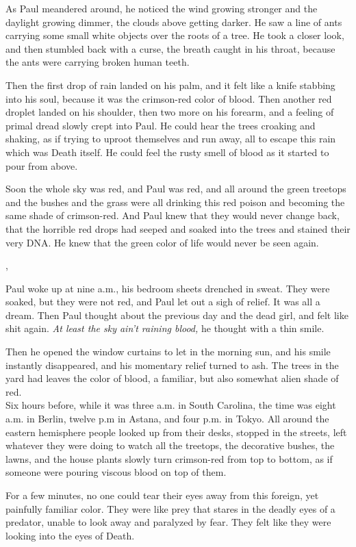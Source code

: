 \documentclass[openany, oneside]{book}
\begin{document}
As Paul meandered around, he noticed the wind growing stronger and the daylight growing dimmer, the clouds above getting darker.
He saw a line of ants carrying some small white objects over the roots of a tree.
He took a closer look, and then stumbled back with a curse, the breath caught in his throat, because the ants were carrying broken human teeth.

Then the first drop of rain landed on his palm, and it felt like a knife stabbing into his soul, because it was the crimson-red color of blood.
Then another red droplet landed on his shoulder, then two more on his forearm, and a feeling of primal dread slowly crept into Paul.
He could hear the trees croaking and shaking, as if trying to uproot themselves and run away, all to escape this rain which was Death itself.
He could feel the rusty smell of blood as it started to pour from above.

Soon the whole sky was red, and Paul was red, and all around the green treetops and the bushes and the grass were all drinking this red poison and becoming the same shade of crimson-red.
And Paul knew that they would never change back, that the horrible red drops had seeped and soaked into the trees and stained their very DNA.
He knew that the green color of life would never be seen again.

\sep

Paul woke up at nine a.m., his bedroom sheets drenched in sweat.
They were soaked, but they were not red, and Paul let out a sigh of relief.
It was all a dream.
Then Paul thought about the previous day and the dead girl, and felt like shit again.
\emph{At least the sky ain't raining blood,} he thought with a thin smile.

Then he opened the window curtains to let in the morning sun, and his smile instantly disappeared, and his momentary relief turned to ash.
The trees in the yard had leaves the color of blood, a familiar, but also somewhat alien shade of red.\\

Six hours before, while it was three a.m. in South Carolina, the time was eight a.m. in Berlin, twelve p.m in Astana, and four p.m. in Tokyo.
All around the eastern hemisphere people looked up from their desks, stopped in the streets, left whatever they were doing to watch all the treetops, the decorative bushes, the lawns, and the house plants slowly turn crimson-red from top to bottom, as if someone were pouring viscous blood on top of them.

For a few minutes, no one could tear their eyes away from this foreign, yet painfully familiar color.
They were like prey that stares in the deadly eyes of a predator, unable to look away and paralyzed by fear. They felt like they were looking into the eyes of Death.\\
\end{document}
